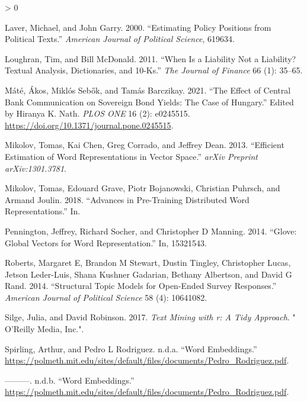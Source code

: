 \documentclass[
]{book}
\newlength{\cslhangindent}
\newenvironment{CSLReferences}[2] %
 {%
  \setlength{\parindent}{0pt}
  \ifodd #1 \everypar{\setlength{\hangindent}{\cslhangindent}}\ignorespaces\fi
  \ifnum #2 > 0
  \setlength{\parskip}{#2\baselineskip}
  \fi
 }%
 {}
\begin{document}
\begin{CSLReferences}{1}{0}
\leavevmode\hypertarget{ref-laver2000estimating}{}%
Laver, Michael, and John Garry. 2000. {``Estimating Policy Positions
from Political Texts.''} \emph{American Journal of Political Science},
619634.

\leavevmode\hypertarget{ref-loughran2011}{}%
Loughran, Tim, and Bill McDonald. 2011. {``When Is a Liability Not a
Liability? Textual Analysis, Dictionaries, and 10-Ks.''} \emph{The
Journal of Finance} 66 (1): 35--65.

\leavevmode\hypertarget{ref-muxe1tuxe92021}{}%
Máté, Ákos, Miklós Sebők, and Tamás Barczikay. 2021. {``The Effect of
Central Bank Communication on Sovereign Bond Yields: The Case of
Hungary.''} Edited by Hiranya K. Nath. \emph{PLOS ONE} 16 (2): e0245515.
\url{https://doi.org/10.1371/journal.pone.0245515}.

\leavevmode\hypertarget{ref-mikolov2013efficient}{}%
Mikolov, Tomas, Kai Chen, Greg Corrado, and Jeffrey Dean. 2013.
{``Efficient Estimation of Word Representations in Vector Space.''}
\emph{arXiv Preprint arXiv:1301.3781}.

\leavevmode\hypertarget{ref-mikolov2018advances}{}%
Mikolov, Tomas, Edouard Grave, Piotr Bojanowski, Christian Puhrsch, and
Armand Joulin. 2018. {``Advances in Pre-Training Distributed Word
Representations.''} In.

\leavevmode\hypertarget{ref-pennington2014glove}{}%
Pennington, Jeffrey, Richard Socher, and Christopher D Manning. 2014.
{``Glove: Global Vectors for Word Representation.''} In, 15321543.

\leavevmode\hypertarget{ref-roberts2014structural}{}%
Roberts, Margaret E, Brandon M Stewart, Dustin Tingley, Christopher
Lucas, Jetson Leder-Luis, Shana Kushner Gadarian, Bethany Albertson, and
David G Rand. 2014. {``Structural Topic Models for Open-Ended Survey
Responses.''} \emph{American Journal of Political Science} 58 (4):
10641082.

\leavevmode\hypertarget{ref-silge2017text}{}%
Silge, Julia, and David Robinson. 2017. \emph{Text Mining with r: A Tidy
Approach}. {"} O'Reilly Media, Inc.{"}.

\leavevmode\hypertarget{ref-spirlingword}{}%
Spirling, Arthur, and Pedro L Rodriguez. n.d.a. {``Word Embeddings.''}
\url{https://polmeth.mit.edu/sites/default/files/documents/Pedro_Rodriguez.pdf}.

\leavevmode\hypertarget{ref-spirlingworda}{}%
---------. n.d.b. {``Word Embeddings.''}
\url{https://polmeth.mit.edu/sites/default/files/documents/Pedro_Rodriguez.pdf}.


\end{CSLReferences}
\end{document}

